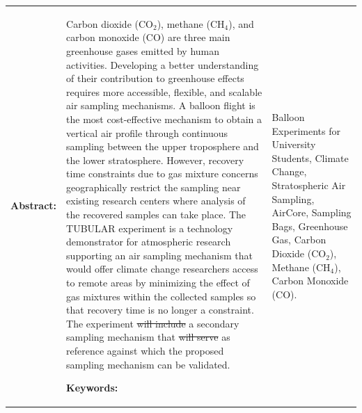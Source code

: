 \documentclass[a4paper,12pt,oneside]{article} %
\providecommand{\DIFaddtex}[1]{{\protect\color{blue}\uwave{#1}}} %
\providecommand{\DIFdeltex}[1]{{\protect\color{red}\sout{#1}}}                      %
\providecommand{\DIFaddbegin}{} %
\providecommand{\DIFaddend}{} %
\providecommand{\DIFdelbegin}{} %
\providecommand{\DIFdelend}{} %
\providecommand{\DIFadd}[1]{\texorpdfstring{\DIFaddtex{#1}}{#1}} %
\providecommand{\DIFdel}[1]{\texorpdfstring{\DIFdeltex{#1}}{}} %
\newcommand{\DIFscaledelfig}{0.5}
\newlength{\DIFdelgraphicswidth} %
\newlength{\DIFdelgraphicsheight} %
\newcommand{\DIFaddincludegraphics}[2][]{{\color{blue}\fbox{\DIFOincludegraphics[#1]{#2}}}} %
\newcommand{\DIFdelincludegraphics}[2][]{%
\sbox{\DIFdelgraphicsbox}{\DIFOincludegraphics[#1]{#2}}%
\settoboxwidth{\DIFdelgraphicswidth}{\DIFdelgraphicsbox} %
\settoboxtotalheight{\DIFdelgraphicsheight}{\DIFdelgraphicsbox} %
\scalebox{\DIFscaledelfig}{%
\parbox[b]{\DIFdelgraphicswidth}{\usebox{\DIFdelgraphicsbox}\\[-\baselineskip] \rule{\DIFdelgraphicswidth}{0em}}\llap{\resizebox{\DIFdelgraphicswidth}{\DIFdelgraphicsheight}{%
\setlength{\unitlength}{\DIFdelgraphicswidth}%
\begin{picture}(1,1)%
\thicklines\linethickness{2pt} %
{\color[rgb]{1,0,0}\put(0,0){\framebox(1,1){}}}%
{\color[rgb]{1,0,0}\put(0,0){\line( 1,1){1}}}%
{\color[rgb]{1,0,0}\put(0,1){\line(1,-1){1}}}%
\end{picture}%
}\hspace*{3pt}}} %
} %
\DeclareRobustCommand{\DIFaddbegin}{\DIFOaddbegin \let\includegraphics\DIFaddincludegraphics} %
\DeclareRobustCommand{\DIFaddend}{\DIFOaddend \let\includegraphics\DIFOincludegraphics} %
\DeclareRobustCommand{\DIFdelbegin}{\DIFOdelbegin \let\includegraphics\DIFdelincludegraphics} %
\DeclareRobustCommand{\DIFdelend}{\DIFOaddend \let\includegraphics\DIFOincludegraphics} %
\begin{document}
\vspace{1cm}
\begin{tabular}{p{} p{}}
\textbf{Abstract:}     & 

\DIFaddbegin \newpage
\DIFaddend Carbon dioxide (CO$_{2}$), methane (CH$_{4}$), and carbon monoxide (CO) are three main greenhouse gases emitted by human activities. Developing a better understanding of their contribution to greenhouse effects requires more accessible, flexible, and scalable air sampling mechanisms. A balloon flight is the most cost-effective mechanism to obtain a vertical air profile through continuous sampling between the upper troposphere and the lower stratosphere. However, recovery time constraints due to gas mixture concerns geographically restrict the sampling near existing research centers where analysis of the recovered samples can take place. The TUBULAR experiment is a technology demonstrator for atmospheric research supporting an air sampling mechanism that would offer climate change researchers access to remote areas by minimizing the effect of gas mixtures within the collected samples so that recovery time is no longer a constraint. The experiment \DIFdelbegin \DIFdel{will include }\DIFdelend \DIFaddbegin \DIFadd{includes }\DIFaddend a secondary sampling mechanism that \DIFdelbegin \DIFdel{will serve }\DIFdelend \DIFaddbegin \DIFadd{serves }\DIFaddend as reference against which the proposed sampling mechanism can be validated.

\textbf{Keywords:}     & %
Balloon Experiments for University Students, Climate Change, Stratospheric Air Sampling, AirCore, Sampling Bags, Greenhouse Gas, Carbon Dioxide (CO$_{2}$), Methane (CH$_{4}$), Carbon Monoxide (CO).
\end{tabular}

\vfill

\newpage
\tableofcontents

\newpage
\end{document}
